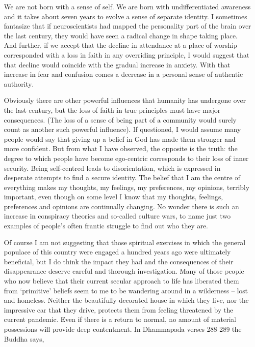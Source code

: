 We are not born with a sense of self. We are born with undifferentiated
awareness and it takes about seven years to evolve a sense of separate
identity. I sometimes fantasize that if neuroscientists had mapped the
personality part of the brain over the last century, they would have
seen a radical change in shape taking place. And further, if we accept
that the decline in attendance at a place of worship corresponded with a
loss in faith in any overriding principle, I would suggest that that
decline would coincide with the gradual increase in anxiety. With that
increase in fear and confusion comes a decrease in a personal sense of
authentic authority.

Obviously there are other powerful influences that humanity has
undergone over the last century, but the loss of faith in true
principles must have major consequences. (The loss of a sense of being
part of a community would surely count as another such powerful
influence). If questioned, I would assume many people would say that
giving up a belief in God has made them stronger and more confident. But
from what I have observed, the opposite is the truth: the degree to
which people have become ego-centric corresponds to their loss of inner
security. Being self-centred leads to disorientation, which is expressed
in desperate attempts to find a secure identity. The belief that I am
the centre of everything makes my thoughts, my feelings, my preferences,
my opinions, terribly important, even though on some level I know that
my thoughts, feelings, preferences and opinions are continually
changing. No wonder there is such an increase in conspiracy theories and
so-called culture wars, to name just two examples of people's often
frantic struggle to find out who they are.

\enlargethispage{\baselineskip}

Of course I am not suggesting that those spiritual exercises in which
the general populace of this country were engaged a hundred years ago
were ultimately beneficial, but I do think the impact they had and the
consequences of their disappearance deserve careful and thorough
investigation. Many of those people who now believe that their current
secular approach to life has liberated them from `primitive' beliefs
seem to me to be wandering around in a wilderness -- lost and homeless.
Neither the beautifully decorated house in which they live, nor the
impressive car that they drive, protects them from feeling threatened by
the current pandemic. Even if there is a return to normal, no amount of
material possessions will provide deep contentment. In Dhammapada verses
288-289 the Buddha says,

